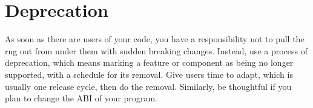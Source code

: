 \section{Deprecation}
As soon as there are users of your code, you have a responsibility not to pull the rug out from under them with sudden breaking changes. 
Instead, use a process of deprecation, which means marking a feature or component as being no longer supported, with a schedule for its removal. Give users time to adapt, which is usually one release cycle, then do the removal.
Similarly, be thoughtful if you plan to change the ABI of your program. 

%
%

